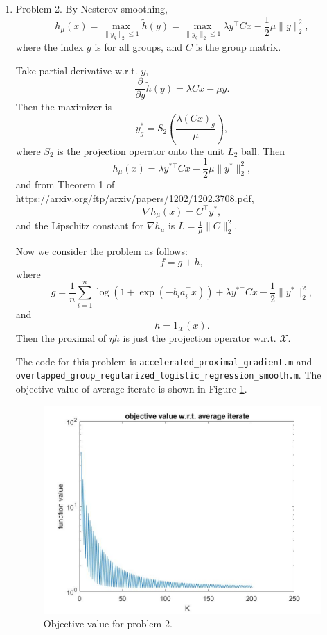 \documentclass{article}
\begin{document}
\begin{enumerate}
\item Problem 2.
By Nesterov smoothing,
$$
h_\mu(x) = \max_{\lVert y_g\rVert_2 \le 1} \tilde{h}(y) = \max_{\lVert y_g\rVert_2 \le 1} \lambda y^\top Cx - \frac{1}{2}\mu\lVert y\rVert_2^2,
$$
where the index $g$ is for all groups, and $C$ is the group matrix.

Take partial derivative w.r.t. $y$,
$$
\frac{\partial}{\partial y}\tilde{h}(y) = \lambda Cx - \mu y.
$$
Then the maximizer is
$$
y_g^* = S_2(\frac{\lambda (Cx)_g}{\mu}),
$$ 
where $S_2 $ is the projection operator onto the unit $L_2 $ ball. Then
$$
h_\mu(x) = \lambda y^{*\top} Cx - \frac{1}{2}\mu \lVert y^*\rVert_2^2,
$$
and from Theorem 1 of https://arxiv.org/ftp/arxiv/papers/1202/1202.3708.pdf,
$$
\nabla h_\mu(x) = C^\top y^*,
$$
and the Lipschitz constant for $\nabla h_\mu $ is $L = \frac{1}{\mu}\lVert C\rVert_2^2 $.

Now we consider the problem as follows:
$$
f = g+h, 
$$
where 
$$
g = \frac{1}{n}\sum_{i=1}^{n}\log(1+\exp(-b_ia_i^\top x))+\lambda y^{*\top} C x - \frac{1}{2}\lVert y^*\rVert_2^2,
$$
and 
$$
h = 1_{\mathcal{X}}(x).
$$
Then the proximal of $\eta h$ is just the projection operator w.r.t. $\mathcal{X}$.

The code for this problem is \texttt{accelerated\_proximal\_gradient.m} and \\
\texttt{overlapped\_group\_regularized\_logistic\_regression\_smooth.m}. The objective value of average iterate is shown in Figure \ref{problem 2}.

\begin{figure}[h]
\centering
\includegraphics[scale=0.3]{problem2.jpg}
\caption{Objective value for problem 2.}
\label{problem 2}
\end{figure}



\end{enumerate}
\end{document}
